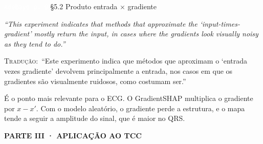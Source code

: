 \documentclass[11pt,a4paper]{article}
\newcommand{\pagechip}[1]{{\setlength{\fboxsep}{1.5pt}\colorbox{cAcc}{\textcolor{white}{\scriptsize\texttt{#1}}}}}
\newcommand{\partbar}[1]{\par\vspace{1.2em}\noindent\colorbox{black!80}{\parbox{\dimexpr\linewidth-2\fboxsep}{\color{white}\bfseries\sffamily\MakeUppercase{#1}}}\par\vspace{0.4em}}
\newenvironment{origquote}{\par\itshape\small}{\par}
\newenvironment{tradquote}{\par\small\textsc{Tradução:}\ }{\par}
\newcommand{\explab}[1]{\par\smallskip{\small\color{cAcc}\textbf{\MakeUppercase{#1}}}\par}
\begin{document}
\begin{citacard}{\pagechip{Adebayo p. 9} §5.2 Produto entrada $\times$ gradiente}
\begin{origquote}“This experiment indicates that methods that approximate the ‘input-times-gradient’ mostly return the input, in cases where the gradients look visually noisy as they tend to do.”\end{origquote}
\begin{tradquote}“Este experimento indica que métodos que aproximam o ‘entrada vezes gradiente’ devolvem principalmente a entrada, nos casos em que os gradientes são visualmente ruidosos, como costumam ser.”\end{tradquote}
\explab{Explicação}
É o ponto mais relevante para o ECG. O GradientSHAP multiplica o gradiente por $x - x'$. Com o modelo aleatório, o gradiente perde a estrutura, e o mapa tende a seguir a amplitude do sinal, que é maior no QRS.
\end{citacard}

\partbar{Parte III · Aplicação ao TCC}
\end{document}
